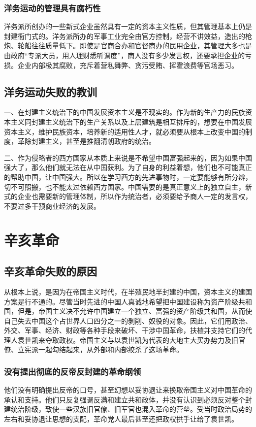 \documentclass{article}
\begin{document}
\begin{CJK}{UTF8}{song}
\subsubsection{洋务运动的管理具有腐朽性}
洋务派所创办的一些新式企业虽然具有一定的资本主义性质，但其管理基本上仍是封建衙门式的。洋务派所办的军事工业完全由官方控制，经营不讲效益，造出的枪炮、轮船往往质量低下。即使是官商合办和官督商办的民用企业，其管理大多也是由政府“专派大员，用人理财悉听调度”，商人没有多少发言权，还要承担企业的亏损。企业内部极其腐败，充斥着营私舞弊、贪污受贿、挥霍浪费等官场恶习。

\subsection{洋务运动失败的教训}
一、在封建主义统治下的中国发展资本主义是不现实的。作为新的生产力的民族资本主义同封建主义统治下的生产关系以及上层建筑是相互排斥的，想要在中国发展资本主义，维护民族资本，培养新的适用性人才，就必须要从根本上改变中国的制度，革除封建主义，甚至是推翻清朝政府的统治。

二、作为侵略者的西方国家从本质上来说是不希望中国富强起来的，因为如果中国强大了，那么他们就无法在从中国获利。为了自身的利益着想，他们也不可能真正的帮助中国，让中国强大。所以在学习西方的先进事物时，一定要能够有所分辨，切不可照搬，也不能太过依赖西方国家。中国需要的是真正意义上的独立自主，新式的企业也需要新的管理体制，所以作为统治者，必须要给予商人一定的发言权，不要过多干预商业经济的发展。

\section{辛亥革命}

\subsection{辛亥革命失败的原因}
从根本上说，是因为在帝国主义时代，在半殖民地半封建的中国，资本主义的建国方案是行不通的。尽管当时先进的中国人真诚地希望把中国建设称为资产阶级共和国，但是，帝国主义决不允许中国建立一个独立、富强的资产阶级共和国，从而使自己失去中国这个占世界人口四分之一的剥削、奴役的对象。因此，它们用政治、外交、军事、经济、财政等各种手段来破坏、干涉中国革命，扶植并支持它们的代理人袁世凯来夺取政权。帝国主义与以袁世凯为代表的大地主大买办势力及旧官僚、立宪派一起勾结起来，从外部和内部绞杀了这场革命。

\subsubsection{没有提出彻底的反帝反封建的革命纲领}
他们没有明确提出反帝的口号，甚至幻想以妥协退让来换取帝国主义对中国革命的承认和支持。他们只反复强调反满和建立共和政体，并没有认识到必须反对整个封建统治阶级，致使一些汉族旧官僚、旧军官也混入革命的营垒。受当时政治局势的左右和妥协退让思想的支配，革命党人最后甚至还把政权拱手让给了袁世凯。

\end{CJK}
\end{document}
